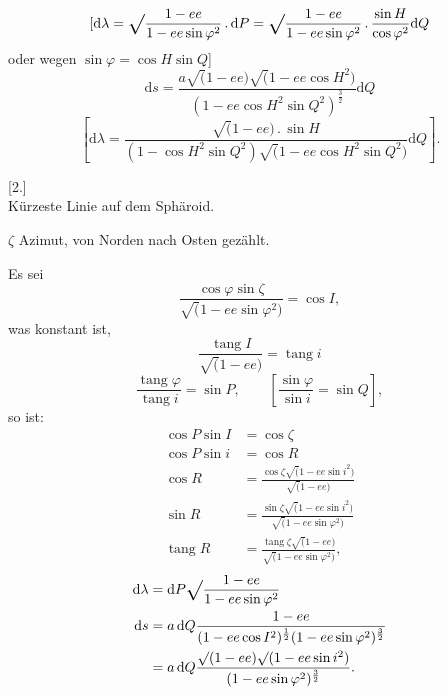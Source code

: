 \par\clearpage
\noindent{}\makebox[12mm][r]{}\par\medskip

\[
[\mathrm d\lambda=\ixrad\frac{1-ee}{1-ee\sin\varphi^2}\,.\,\mathrm dP
=\ixrad\frac{1-ee}{1-ee\sin\varphi^2}\,.\,\frac{\sin H}{\cos\varphi^2}\mathrm dQ
\]
\noindent oder wegen \(\sin\varphi=\cos H\sin Q\)]
\[
\mathrm ds=\frac{a\surd(1-ee)\surd(1-ee\cos H^2)}
{(1-ee\cos H^2\sin Q^2)^{\frac32}}\mathrm dQ
\]
\[
\left[\mathrm d\lambda=\frac{\surd(1-ee)\,.\,\sin H}
{(1-\cos H^2\sin Q^2)\surd(1-ee\cos H^2\sin Q^2)}\mathrm dQ\right].
\]

\bigskip
\begin{center}
[2.]\\[.5ex]
Kürzeste Linie auf dem Sphäroid.
\end{center}

\(\zeta\) Azimut, von Norden nach Osten gezählt.

Es sei
\[
\frac{\cos\varphi\sin\zeta}{\surd(1-ee\sin\varphi^2)}=\cos I,
\]
\noindent was konstant ist,
\[
\frac{\operatorname{tang}I}{\surd(1-ee)}=\operatorname{tang}i
\]
\[
\frac{\operatorname{tang}\varphi}{\operatorname{tang}i}=\sin P,\qquad
\left[\frac{\sin\varphi}{\sin i}=\sin Q\right],
\]
\noindent so ist:
\[
\begin{aligned}
\cos P\sin I&=\cos\zeta\\
\cos P\sin i&=\cos R\\
\cos R&=\frac{\cos\zeta\surd(1-ee\sin i^2)}{\surd(1-ee)}\\
\sin R&=\frac{\sin\zeta\surd(1-ee\sin i^2)}{\surd(1-ee\sin\varphi^2)}\\
\operatorname{tang}R&=\frac{\operatorname{tang}\zeta\surd(1-ee)}{\surd(1-ee\sin\varphi^2)},
\end{aligned}
\]
\[
\begin{aligned}
\mathrm d\lambda&=\mathrm dP\ixrad\frac{1-ee}{1-ee\sin\varphi^2}\\
\mathrm ds&=a\,\mathrm dQ\frac{1-ee}{(1-ee\cos I^2)^{\frac12}(1-ee\sin\varphi^2)^{\frac32}}\\
&=a\,\mathrm dQ\frac{\surd(1-ee)\surd(1-ee\sin i^2)}
{(1-ee\sin\varphi^2)^{\frac32}}.
\end{aligned}
\]

\par\clearpage
\noindent\makebox[12mm][l]{}\par\medskip

